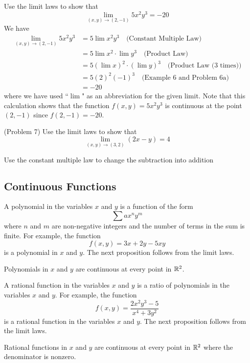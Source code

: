 \documentclass[handout]{ximera}
\begin{document}
\begin{example}[Example 7]
Use the limit laws to show that 
\[
\lim_{(x,y) \to (2,-1)} 5x^2y^3 = -20
\]
We have
\begin{align*}
\lim_{(x,y) \to (2,-1)} 5x^2y^3 &= 5\lim x^2y^3 \quad \text{(Constant Multiple Law)}\\
  &= 5 \lim x^2 \cdot \lim y^3  \quad \text{(Product Law)}\\
  &= 5 \left(\lim x\right)^2 \cdot \left(\lim y\right)^3  \quad \text{(Product Law (3 times))}\\
  &= 5(2)^2(-1)^3 \quad \text{(Example 6 and Problem 6a)}\\
  &= -20
\end{align*}
where we have used ``$\lim$" as an abbreviation for the given limit.
Note that this calculation shows that the function $f(x,y) = 5x^2y^3$ is continuous at the point $(2, -1)$ since $f(2, -1) = -20$.
\end{example}


\begin{problem}(Problem 7)
Use the limit laws to show that 
\[
\lim_{(x,y) \to (3,2)} (2x - y) = 4
\]
\begin{hint}
Use the constant multiple law to change the subtraction into addition
\end{hint}
\end{problem}

\subsection{Continuous Functions}
A polynomial in the variables $x$ and $y$ is a function of the form
\[
\sum ax^ny^m
\]
where $n$ and $m$ are non-negative integers and the number of terms in the sum is finite.
For example, the function
\[
f(x,y) = 3x + 2y - 5xy
\]
is a polynomial in $x$ and $y$. The next proposition follows from the limit laws.

\begin{proposition}
Polynomials in $x$ and $y$ are continuous at every point in $\mathbb R^2$.
\end{proposition}

A rational function in the variables $x$ and $y$ is a ratio of polynomials in the variables $x$ and $y$.
For example, the function
\[
f(x,y) = \frac{2x^2y^3 - 5}{x^4 + 3y^2}
\]
is a rational function in the variables $x$ and $y$.
The next proposition follows from the limit laws.

\begin{proposition}
Rational functions in $x$ and $y$ are continuous at every point in $\mathbb R^2$ where the denominator is nonzero.
\end{proposition}
\end{document}
